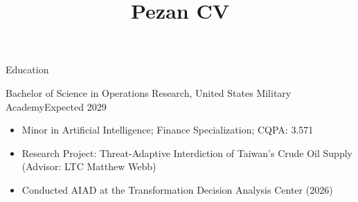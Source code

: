 \documentclass{resume}
\title{Pezan CV}
\begin{document}
\renewcommand{\labelitemi}{\textendash}

\begin{rSection}{Education}\itemsep -1pt

\begin{rSubsection}{\textnormal{Bachelor of Science in Operations Research,} United States Military Academy}{Expected 2029}{}
\vspace{-3pt}
\begin{itemize}
\setlength\itemsep{-1.5ex}
    \item Minor in Artificial Intelligence; Finance Specialization; CQPA: 3.571
    \item Research Project: Threat-Adaptive Interdiction of Taiwan's Crude Oil Supply (Advisor: LTC Matthew Webb)
    \item Conducted AIAD at the Transformation Decision Analysis Center (2026)
\end{itemize}
\end{rSubsection}

\end{rSection}
\end{document}
